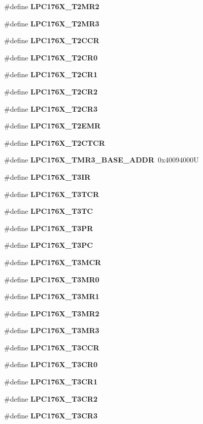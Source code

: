 \begin{DoxyCompactItemize}
\#define {\bfseries L\+P\+C176\+X\+\_\+\+T2\+M\+R2}
\item 
\#define {\bfseries L\+P\+C176\+X\+\_\+\+T2\+M\+R3}
\item 
\#define {\bfseries L\+P\+C176\+X\+\_\+\+T2\+C\+CR}
\item 
\#define {\bfseries L\+P\+C176\+X\+\_\+\+T2\+C\+R0}
\item 
\#define {\bfseries L\+P\+C176\+X\+\_\+\+T2\+C\+R1}
\item 
\#define {\bfseries L\+P\+C176\+X\+\_\+\+T2\+C\+R2}
\item 
\#define {\bfseries L\+P\+C176\+X\+\_\+\+T2\+C\+R3}
\item 
\#define {\bfseries L\+P\+C176\+X\+\_\+\+T2\+E\+MR}
\item 
\#define {\bfseries L\+P\+C176\+X\+\_\+\+T2\+C\+T\+CR}
\item 
\mbox{\label{timer-defs_8h_a339a1ba0680543aa4d5409b8ded749b9}} 
\#define {\bfseries L\+P\+C176\+X\+\_\+\+T\+M\+R3\+\_\+\+B\+A\+S\+E\+\_\+\+A\+D\+DR}~0x40094000U
\item 
\#define {\bfseries L\+P\+C176\+X\+\_\+\+T3\+IR}
\item 
\#define {\bfseries L\+P\+C176\+X\+\_\+\+T3\+T\+CR}
\item 
\#define {\bfseries L\+P\+C176\+X\+\_\+\+T3\+TC}
\item 
\#define {\bfseries L\+P\+C176\+X\+\_\+\+T3\+PR}
\item 
\#define {\bfseries L\+P\+C176\+X\+\_\+\+T3\+PC}
\item 
\#define {\bfseries L\+P\+C176\+X\+\_\+\+T3\+M\+CR}
\item 
\#define {\bfseries L\+P\+C176\+X\+\_\+\+T3\+M\+R0}
\item 
\#define {\bfseries L\+P\+C176\+X\+\_\+\+T3\+M\+R1}
\item 
\#define {\bfseries L\+P\+C176\+X\+\_\+\+T3\+M\+R2}
\item 
\#define {\bfseries L\+P\+C176\+X\+\_\+\+T3\+M\+R3}
\item 
\#define {\bfseries L\+P\+C176\+X\+\_\+\+T3\+C\+CR}
\item 
\#define {\bfseries L\+P\+C176\+X\+\_\+\+T3\+C\+R0}
\item 
\#define {\bfseries L\+P\+C176\+X\+\_\+\+T3\+C\+R1}
\item 
\#define {\bfseries L\+P\+C176\+X\+\_\+\+T3\+C\+R2}
\item 
\#define {\bfseries L\+P\+C176\+X\+\_\+\+T3\+C\+R3}
\item 

\end{DoxyCompactItemize}

